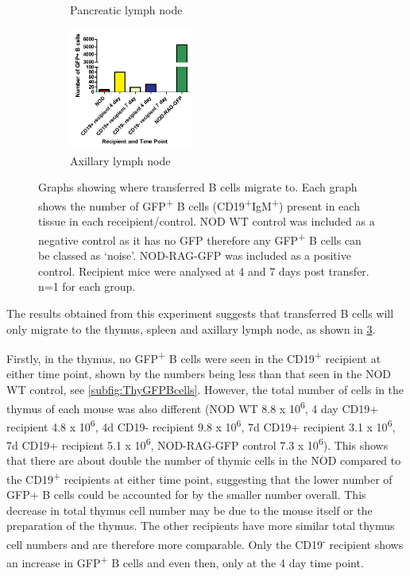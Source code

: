 \begin{figure}
\begin{subfigure}{0.45\textwidth}
	\caption{Pancreatic lymph node}
	\label{subfig:PLNGFPBcells}
	\end{subfigure}
	\begin{subfigure}{\textwidth}
	\centering
	\includegraphics[width=0.45\textwidth]{Figures/axLNGFPBcells.pdf}
	\caption{Axillary lymph node}
	\label{subfig:axLNGFPBcells}
	\end{subfigure}
\caption{Graphs showing where transferred B cells migrate to.
Each graph shows the number of GFP\textsuperscript{+} B cells (CD19\textsuperscript{+}IgM\textsuperscript{+}) present in each tissue in each receipient/control. NOD WT control was included as a negative control as it has no GFP therefore any GFP\textsuperscript{+} B cells can be classed as `noise'. 
NOD-RAG-GFP was included as a positive control. 
Recipient mice were analysed at 4 and 7 days post transfer. n=1 for each group.}
\label{fig:GFPBcellgraphs}
\end{figure}

The results obtained from this experiment suggests that transferred B cells will only migrate to the thymus, spleen and axillary lymph node, as shown in \cref{fig:GFPBcellgraphs}.

Firstly, in the thymus, no GFP\textsuperscript{+} B cells were seen in the CD19\textsuperscript{+} recipient at either time point, shown by the numbers being less than that seen in the NOD WT control, see \cref{subfig:ThyGFPBcells}.
However, the total number of cells in the thymus of each mouse was also different (NOD WT 8.8 x 10\textsuperscript{6}, 4 day CD19+ recipient 4.8 x 10\textsuperscript{6}, 4d CD19- recipient 9.8 x 10\textsuperscript{6}, 7d CD19+ recipient 3.1 x 10\textsuperscript{6}, 7d CD19+ recipient 5.1 x 10\textsuperscript{6}, NOD-RAG-GFP control 7.3 x 10\textsuperscript{6}).
This shows that there are about double the number of thymic cells in the NOD compared to the CD19\textsuperscript{+} recipients at either time point, suggesting that the lower number of GFP+ B cells could be accounted for by the smaller number overall.
This decrease in total thymus cell number may be due to the mouse itself or the preparation of the thymus.
The other recipients have more similar total thymus cell numbers and are therefore more comparable.
Only the CD19\textsuperscript{-} recipient shows an increase in GFP\textsuperscript{+} B cells and even then, only at the 4 day time point.

